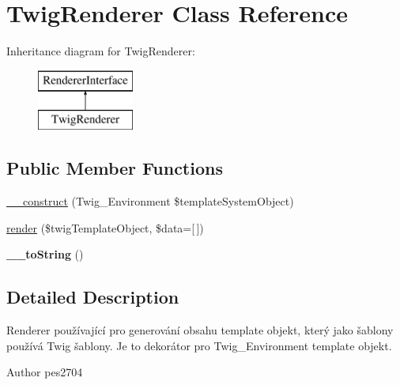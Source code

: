 \hypertarget{class_pes_1_1_view_1_1_renderer_1_1_twig_renderer}{}\section{Twig\+Renderer Class Reference}
\label{class_pes_1_1_view_1_1_renderer_1_1_twig_renderer}
Inheritance diagram for Twig\+Renderer\+:\begin{figure}[H]
\begin{center}
\leavevmode
\includegraphics[height=2.000000cm]{class_pes_1_1_view_1_1_renderer_1_1_twig_renderer}
\end{center}
\end{figure}
\subsection*{Public Member Functions}
\begin{DoxyCompactItemize}
\item 
\mbox{\hyperlink{class_pes_1_1_view_1_1_renderer_1_1_twig_renderer_a1eb399f5f16f1e1464e02960c1d4620b}{\+\_\+\+\_\+construct}} (Twig\+\_\+\+Environment \$template\+System\+Object)
\item 
\mbox{\hyperlink{class_pes_1_1_view_1_1_renderer_1_1_twig_renderer_a09fbe510a869ecd4b71980fa5747ba39}{render}} (\$twig\+Template\+Object, \$data=\mbox{[}$\,$\mbox{]})
\item 
\mbox{\label{class_pes_1_1_view_1_1_renderer_1_1_twig_renderer_a7516ca30af0db3cdbf9a7739b48ce91d}} 
{\bfseries \+\_\+\+\_\+to\+String} ()
\end{DoxyCompactItemize}


\subsection{Detailed Description}
Renderer používající pro generování obsahu template objekt, který jako šablony používá Twig šablony. Je to dekorátor pro Twig\+\_\+\+Environment template objekt.

\begin{DoxyAuthor}{Author}
pes2704 
\end{DoxyAuthor}


